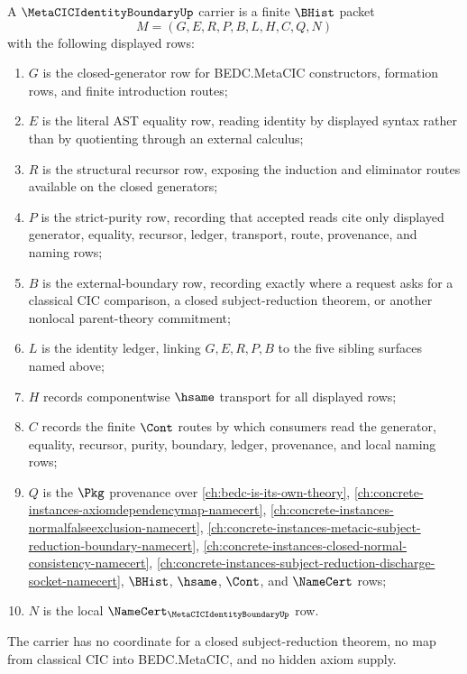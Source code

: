 \begin{definition}
\label{def:metacic-identity-boundary-carrier}
A $\MetaCICIdentityBoundaryUp$ carrier is a finite $\BHist$ packet
$$
M=(G,E,R,P,B,L,H,C,Q,N)
$$
with the following displayed rows:
\begin{enumerate}
\item $G$ is the closed-generator row for BEDC.MetaCIC constructors, formation rows, and finite introduction routes;
\item $E$ is the literal AST equality row, reading identity by displayed syntax rather than by quotienting through an external calculus;
\item $R$ is the structural recursor row, exposing the induction and eliminator routes available on the closed generators;
\item $P$ is the strict-purity row, recording that accepted reads cite only displayed generator, equality, recursor, ledger, transport, route, provenance, and naming rows;
\item $B$ is the external-boundary row, recording exactly where a request asks for a classical CIC comparison, a closed subject-reduction theorem, or another nonlocal parent-theory commitment;
\item $L$ is the identity ledger, linking $G,E,R,P,B$ to the five sibling surfaces named above;
\item $H$ records componentwise $\hsame$ transport for all displayed rows;
\item $C$ records the finite $\Cont$ routes by which consumers read the generator, equality, recursor, purity, boundary, ledger, provenance, and local naming rows;
\item $Q$ is the $\Pkg$ provenance over \autoref{ch:bedc-is-its-own-theory}, \autoref{ch:concrete-instances-axiomdependencymap-namecert}, \autoref{ch:concrete-instances-normalfalseexclusion-namecert}, \autoref{ch:concrete-instances-metacic-subject-reduction-boundary-namecert}, \autoref{ch:concrete-instances-closed-normal-consistency-namecert}, \autoref{ch:concrete-instances-subject-reduction-discharge-socket-namecert}, $\BHist$, $\hsame$, $\Cont$, and $\NameCert$ rows;
\item $N$ is the local $\NameCert_{\MetaCICIdentityBoundaryUp}$ row.
\end{enumerate}
The carrier has no coordinate for a closed subject-reduction theorem, no map from classical CIC into BEDC.MetaCIC, and no hidden axiom supply.
\end{definition}

